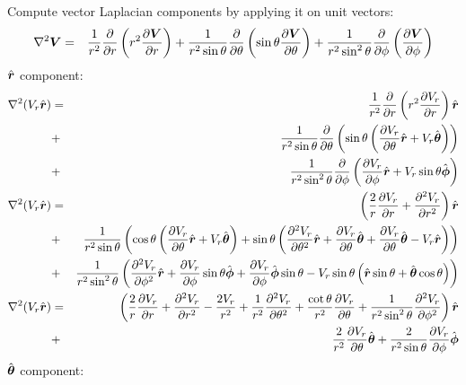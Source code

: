 \documentclass[11pt]{article}
\begin{document}
Compute vector Laplacian components by applying it on unit vectors:
\begin{eqnarray}
\Laplacian \bV &=& \frac{1}{r^2}\deriv{}{r}\left(r^2 \deriv{\bV}{r}\right) +
\frac{1}{r^2\sin\theta}\deriv{}{\theta}\left(\sin\theta\deriv{\bV}{\theta}\right)+
\frac{1}{r^2 \sin^2\theta}\deriv{}{\phi}\left(\deriv{\bV}{\phi}\right)
\end{eqnarray}
$\brhat$ component:
\begin{eqnarray}
\Laplacian (V_r\brhat) &=&
\frac{1}{r^2}\deriv{}{r}\left(r^2 \deriv{V_r}{r}\right)\brhat
\\ &+&
\frac{1}{r^2\sin\theta}\deriv{}{\theta}\left(
\sin\theta\left(\deriv{V_r}{\theta}\brhat + V_r\bthetahat \right)\right)
\\ &+&
\frac{1}{r^2 \sin^2\theta}\deriv{}{\phi}\left(
\deriv{V_r}{\phi}\brhat + V_r \sin\theta\bphihat
\right) \\
\Laplacian (V_r\brhat) &=&
\left(
\frac{2}{r}\deriv{V_r}{r}+\deriv{^2V_r}{r^2}\right)\brhat
\\ &+&
\frac{1}{r^2\sin\theta}\left(
\cos\theta\left(\deriv{V_r}{\theta}\brhat + V_r\bthetahat \right) +
\sin\theta\left(\deriv{^2V_r}{\theta^2}\brhat + \deriv{V_r}{\theta}\bthetahat + \deriv{V_r}{\theta}\bthetahat - V_r\brhat\right)
\right)
\\ &+&
\frac{1}{r^2 \sin^2\theta}\left(
\deriv{^2V_r}{\phi^2}\brhat + \deriv{V_r}{\phi} \sin\theta\bphihat +
\deriv{V_r}{\phi}\bphihat\sin\theta - V_r \sin\theta
\left(\brhat \sin\theta + \bthetahat \cos\theta \right)
\right)
\\
\Laplacian (V_r\brhat) &=&
\left(
\frac{2}{r}\deriv{V_r}{r}+\deriv{^2V_r}{r^2}-\frac{2V_r}{r^2}
+ \frac{1}{r^2}\deriv{^2V_r}{\theta^2}
+ \frac{\cot\theta}{r^2} \deriv{V_r}{\theta}
+ \frac{1}{r^2 \sin^2\theta} \deriv{^2V_r}{\phi^2}
\right)\brhat
\\ &+& \frac{2}{r^2} \deriv{V_r}{\theta} \bthetahat + \frac{2}{r^2 \sin\theta}\deriv{V_r}{\phi} \bphihat
\end{eqnarray}
$\bthetahat$ component:
\end{document}
